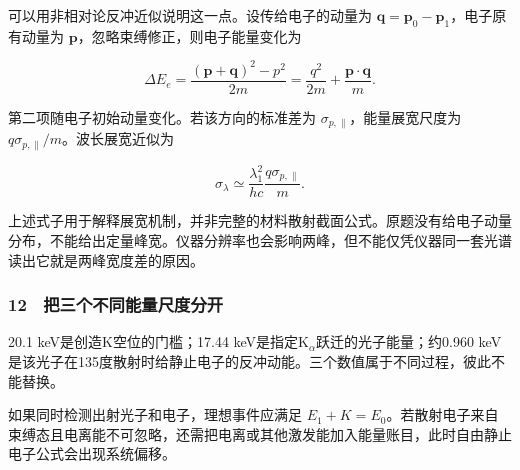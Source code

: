 \documentclass[12pt,a4paper,fontset=fandol]{ctexart}
\begin{document}
可以用非相对论反冲近似说明这一点。设传给电子的动量为
\(\boldsymbol q=\boldsymbol p_0-\boldsymbol p_1\)，电子原有动量为
\(\boldsymbol p\)，忽略束缚修正，则电子能量变化为

\[\Delta E_e=\frac{(\boldsymbol p+\boldsymbol q)^2-p^2}{2m}
=\frac{q^2}{2m}+\frac{\boldsymbol p\cdot\boldsymbol q}{m}.\]

第二项随电子初始动量变化。若该方向的标准差为
\(\sigma_{p,\parallel}\)，能量展宽尺度为
\(q\sigma_{p,\parallel}/m\)。波长展宽近似为

\[\sigma_\lambda\simeq\frac{\lambda_1^2}{hc}
\frac{q\sigma_{p,\parallel}}m.\]

上述式子用于解释展宽机制，并非完整的材料散射截面公式。原题没有给电子动量分布，不能给出定量峰宽。仪器分辨率也会影响两峰，但不能仅凭仪器同一套光谱读出它就是两峰宽度差的原因。

\subsubsection{12　把三个不同能量尺度分开}\label{ux628aux4e09ux4e2aux4e0dux540cux80fdux91cfux5c3aux5ea6ux5206ux5f00}

20.1 keV是创造K空位的门槛；17.44
keV是指定K\(_\alpha\)跃迁的光子能量；约0.960
keV是该光子在135度散射时给静止电子的反冲动能。三个数值属于不同过程，彼此不能替换。

如果同时检测出射光子和电子，理想事件应满足
\(E_1+K=E_0\)。若散射电子来自束缚态且电离能不可忽略，还需把电离或其他激发能加入能量账目，此时自由静止电子公式会出现系统偏移。
\end{document}
